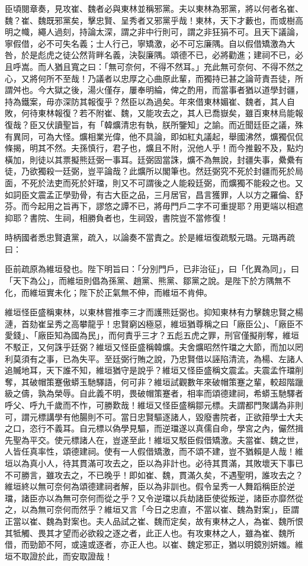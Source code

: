 \begin{pinyinscope}
臣頃閱章奏，見攻崔、魏者必與東林並稱邪黨。夫以東林為邪黨，將以何者名崔、魏？崔、魏既邪黨矣，擊忠賢、呈秀者又邪黨乎哉！東林，天下才藪也，而或樹高明之幟，繩人過刻，持論太深，謂之非中行則可，謂之非狂狷不可。且天下議論，寧假借，必不可失名義；士人行己，寧矯激，必不可忘廉隅。自以假借矯激為大咎，於是彪虎之徒公然背畔名義，決裂廉隅。頌德不已，必將勸進；建祠不已，必且呼嵩。而人猶且寬之曰：「無可奈何，不得不然耳。」充此無可奈何、不得不然之心，又將何所不至哉！乃議者以忠厚之心曲原此輩，而獨持已甚之論苛責吾徒，所謂舛也。今大獄之後，湯火僅存，屢奉明綸，俾之酌用，而當事者猶以道學封疆，持為鐵案，毋亦深防其報復乎？然臣以為過矣。年來借東林媚崔、魏者，其人自敗，何待東林報復？若不附崔、魏，又能攻去之，其人已喬嶽矣，雖百東林烏能報復哉？臣又伏讀聖旨，有「韓爌清忠有執，朕所鑒知」之諭。而近聞廷臣之議，殊有異同，可為大怪。爌相業光偉，他不具論，即如紅丸議起，舉國沸然，爌獨侃侃條揭，明其不然。夫孫慎行，君子也，爌且不附，況他人乎！而今推轂不及，點灼橫加，則徒以其票擬熊廷弼一事耳。廷弼固當誅，爌不為無說，封疆失事，纍纍有徒，乃欲獨殺一廷弼，豈平論哉？此爌所以閣筆也。然廷弼究不死於封疆而死於局面，不死於法吏而死於奸璫，則又不可謂後之人能殺廷弼，而爌獨不能殺之也。又如詞臣文震孟正學勁骨，有古大臣之品，三月居官，昌言獲罪，人以方之羅倫、舒芬。而今起用之旨再下，謬悠之譚不已，將毋門戶二字不可重提耶？用更端以相遮抑耶？書院、生祠，相勝負者也，生祠毀，書院豈不當修復！

時柄國者悉忠賢遺黨，疏入，以論奏不當責之。於是維垣復疏駁元璐。元璐再疏曰：

臣前疏原為維垣發也。陛下明旨曰：「分別門戶，已非治征」，曰「化異為同」，曰「天下為公」，而維垣則倡為孫黨、趙黨、熊黨、鄒黨之說。是陛下於方隅無不化，而維垣實未化；陛下於正氣無不伸，而維垣不肯伸。

維垣怪臣盛稱東林，以東林嘗推李三才而護熊廷弼也。抑知東林有力擊魏忠賢之楊漣，首劾崔呈秀之高攀龍乎！忠賢窮凶極惡，維垣猶尊稱之曰「廠臣公」、「廠臣不愛錢」、「廠臣知為國為民」，而何責乎三才？五彪五虎之罪，刑官僅擬削奪，維垣不駁正，又何誅乎廷弼？維垣又怪臣盛稱韓爌。夫舍爌昭然忤璫之大節，而加以罔利莫須有之事，已為失平。至廷弼行賄之說，乃忠賢借以誣陷清流，為楊、左諸人追贓地耳，天下誰不知，維垣猶守是說乎？維垣又怪臣盛稱文震孟。夫震孟忤璫削奪，其破帽策蹇傲蟒玉馳驛語，何可非？維垣試觀數年來破帽策蹇之輩，較超階躐級之儔，孰為榮辱。自此義不明，畏破帽策蹇者，相率而頌德建祠，希蟒玉馳驛者呼父、呼九千歲而不怍，可勝歎哉！維垣又怪臣盛稱鄒元標。夫謂都門聚講為非則可，謂元標講學有他腸則不可。當日忠賢驅逐諸人，毀廢書院者，正欲箝學士大夫之口，恣行不義耳。自元標以偽學見驅，而逆璫遂以真儒自命，學宮之內，儼然揖先聖為平交。使元標諸人在，豈遂至此！維垣又駁臣假借矯激。夫當崔、魏之世，人皆任真率性，頌德建祠。使有一人假借矯激，而不頌不建，豈不猶賴是人哉！維垣以為真小人，待其貫滿可攻去之，臣以為非計也。必待其貫滿，其敗壞天下事已不可勝言，雖攻去之，不已晚乎！即如崔、魏，貫滿久矣，不遇聖明，誰攻去之？維垣終以無可奈何為頌德建祠者解，臣以為非訓也。假令呈秀一人舞蹈稱臣於逆璫，諸臣亦以為無可奈何而從之乎？又令逆璫以兵劫諸臣使從叛逆，諸臣亦靡然從之，以為無可奈何而然乎？維垣又言「今日之忠直，不當以崔、魏為對案」，臣謂正當以崔、魏為對案也。夫人品試之崔、魏而定矣，故有東林之人，為崔、魏所恨其牴觸、畏其才望而必欲殺之逐之者，此正人也。有攻東林之人，雖為崔、魏所借，而勁節不阿，或遠或逐者，亦正人也。以崔、魏定邪正，猶以明鏡別妍媸。維垣不取證於此，而安取證哉！


\end{pinyinscope}
